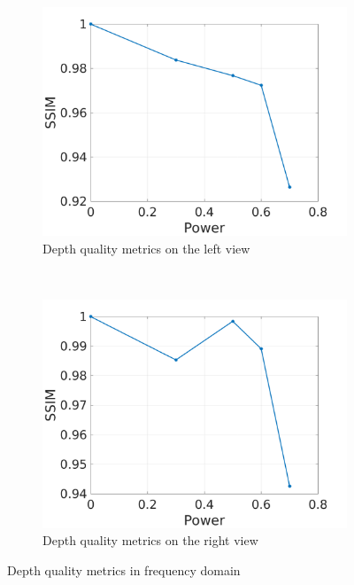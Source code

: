 \begin{figure}[h!]
    \centering
    \begin{subfigure}[t]{0.5\textwidth}
        \centering
\includegraphics[width=1\textwidth]{./img/qm/qm_right.png}
          \caption{\small{Depth quality metrics on the left view}}
\label{fig:qmcr}

    \end{subfigure}%
    ~ 
    \begin{subfigure}[t]{0.5\textwidth}
        \centering
\includegraphics[width=1\textwidth]{./img/qm/qm_disp_right.png}
           \caption{\small{Depth quality metrics on the right view}}
\label{fig:qmdr}
    \end{subfigure}
    \caption{Depth quality metrics in frequency domain }
        \label{fig:qmr}
\end{figure}
\clearpage

